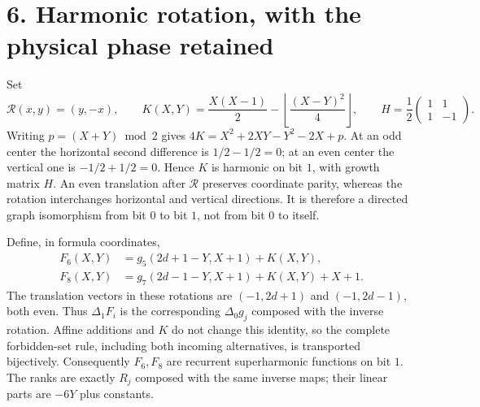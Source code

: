 \documentclass[11pt]{article}
\begin{document}
\section*{6. Harmonic rotation, with the physical phase retained}
Set
\[
 \mathcal R(x,y)=(y,-x),\qquad
 K(X,Y)=\frac{X(X-1)}2-\left\lfloor\frac{(X-Y)^2}{4}\right\rfloor,
 \qquad H=\frac12\begin{pmatrix}1&1\\1&-1\end{pmatrix}.
\]
Writing $p=(X+Y)\bmod2$ gives
$4K=X^2+2XY-Y^2-2X+p$. At an odd center the horizontal second
difference is $1/2-1/2=0$; at an even center the vertical one is
$-1/2+1/2=0$. Hence $K$ is harmonic on bit $1$, with growth matrix $H$.
An even translation after $\mathcal R$ preserves coordinate parity,
whereas the rotation interchanges horizontal and vertical directions.
It is therefore a directed graph isomorphism from bit $0$ to bit $1$,
not from bit $0$ to itself.

Define, in formula coordinates,
\[
\begin{split}
 F_6(X,Y)&=g_5(2d+1-Y,X+1)+K(X,Y),\\
 F_8(X,Y)&=g_7(2d-1-Y,X+1)+K(X,Y)+X+1.
\end{split}                                              \tag{15}
\]
The translation vectors in these rotations are $(-1,2d+1)$ and
$(-1,2d-1)$, both even. Thus $\Delta_1F_i$ is the corresponding
$\Delta_0g_j$ composed with the inverse rotation. Affine additions and
$K$ do not change this identity, so the complete forbidden-set rule,
including both incoming alternatives, is transported bijectively.
Consequently $F_6,F_8$ are recurrent superharmonic functions on bit $1$.
The ranks are exactly $R_j$ composed with the same inverse maps;
their linear parts are $-6Y$ plus constants.
\end{document}
